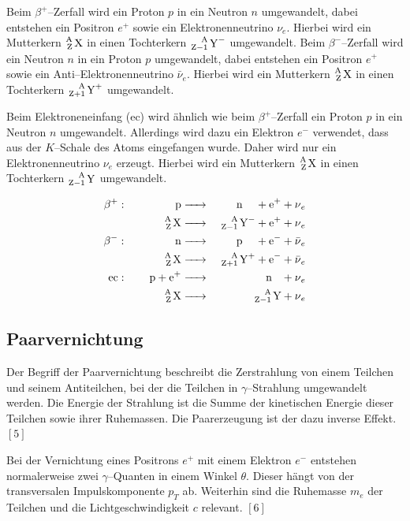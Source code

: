\documentclass[12pt,a4paper]{scrartcl}
\numberwithin{equation}{section} %
\renewcommand{\[}{} %
\renewcommand{\]}{\noindent} %
\begin{document}
Beim \(\beta^+\)--Zerfall wird ein Proton \(p\) in ein Neutron \(n\)
umgewandelt, dabei entstehen ein Positron \(e^+\) sowie ein
Elektronenneutrino \(\nu_e\). Hierbei wird ein Mutterkern
\(\ce{^A_Z X}\) in einen Tochterkern \(\ce{^A_{Z-1} Y^-}\) umgewandelt.
Beim \(\beta^-\)--Zerfall wird ein Neutron \(n\) in ein Proton \(p\)
umgewandelt, dabei entstehen ein Positron \(e^+\) sowie ein
Anti--Elektronenneutrino \(\bar{\nu}_e\). Hierbei wird ein Mutterkern
\(\ce{^A_Z X}\) in einen Tochterkern \(\ce{^A_{Z+1} Y^+}\) umgewandelt.

Beim Elektroneneinfang (ec) wird ähnlich wie beim \(\beta^+\)--Zerfall
ein Proton \(p\) in ein Neutron \(n\) umgewandelt. Allerdings wird dazu
ein Elektron \(e^-\) verwendet, dass aus der \(K\)--Schale des Atoms
eingefangen wurde. Daher wird nur ein Elektronenneutrino \(\nu_e\)
erzeugt. Hierbei wird ein Mutterkern \(\ce{^A_Z X}\) in einen
Tochterkern \(\ce{^A_{Z-1} Y}\) umgewandelt.

\[
\begin{eqnarray}
    \beta^+:\qquad\,\,\qquad
        \ce{p} &\ce{->}& \quad \ce{n} \quad\, + \ce{e^+} + \ce{\nu_e} \\
        \ce{^A_Z X} &\ce{->}& \ce{^A_{Z-1} Y^-} + \ce{e^+} + \ce{\nu_e} \\
    \beta^-:\qquad\,\,\qquad
        \ce{n} &\ce{->}& \quad \ce{p} \quad\, + \ce{e^-} + \ce{\bar{\nu}_e} \\
        \ce{^A_Z X} &\ce{->}& \ce{^A_{Z+1} Y^+} + \ce{e^-} + \ce{\bar{\nu}_e} \\
    \text{ec}:\qquad
        \ce{p + e^+} &\ce{->}& \quad \ce{n} \ \ \, + \ce{\nu_e} \\
        \ce{^A_Z X} &\ce{->}& \ce{^A_{Z-1} Y} + \ce{\nu_e}
\end{eqnarray}
\]

\hypertarget{paarvernichtung}{%
\subsection{Paarvernichtung}\label{paarvernichtung}}

Der Begriff der Paarvernichtung beschreibt die Zerstrahlung von einem
Teilchen und seinem Antiteilchen, bei der die Teilchen in
\(\gamma\)--Strahlung umgewandelt werden. Die Energie der Strahlung ist
die Summe der kinetischen Energie dieser Teilchen sowie ihrer
Ruhemassen. Die Paarerzeugung ist der dazu inverse Effekt. \([5]\)

Bei der Vernichtung eines Positrons \(e^+\) mit einem Elektron \(e^-\)
entstehen normalerweise zwei \(\gamma\)--Quanten in einem Winkel
\(\theta\). Dieser hängt von der transversalen Impulskomponente \(p_T\)
ab. Weiterhin sind die Ruhemasse \(m_e\) der Teilchen und die
Lichtgeschwindigkeit \(c\) relevant. \([6]\)
\end{document}
